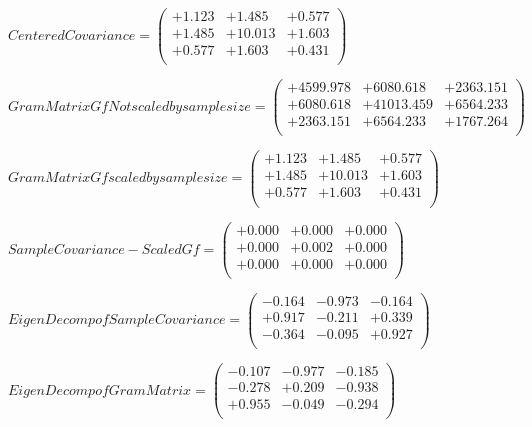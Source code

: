 \documentclass[9pt]{article}
\theoremstyle{plain}
\theoremstyle{definition}
\theoremstyle{remark}
\numberwithin{equation}{section}
\begin{document}
$Centered Covariance = \left(
\begin{array}{
ccc}
+1.123 & +1.485 & +0.577 \\
+1.485 & +10.013 & +1.603 \\
+0.577 & +1.603 & +0.431 \\
\end{array}
\right)$ \newline 

$Gram Matrix Gf Not scaled by sample size = \left(
\begin{array}{
ccc}
+4599.978 & +6080.618 & +2363.151 \\
+6080.618 & +41013.459 & +6564.233 \\
+2363.151 & +6564.233 & +1767.264 \\
\end{array}
\right)$ \newline 

$Gram Matrix Gf  scaled by sample size = \left(
\begin{array}{
ccc}
+1.123 & +1.485 & +0.577 \\
+1.485 & +10.013 & +1.603 \\
+0.577 & +1.603 & +0.431 \\
\end{array}
\right)$ \newline 

$SampleCovariance - Scaled Gf = \left(
\begin{array}{
ccc}
+0.000 & +0.000 & +0.000 \\
+0.000 & +0.002 & +0.000 \\
+0.000 & +0.000 & +0.000 \\
\end{array}
\right)$ \newline 

$EigenDecomp of SampleCovariance = \left(
\begin{array}{
ccc}
-0.164 & -0.973 & -0.164 \\
+0.917 & -0.211 & +0.339 \\
-0.364 & -0.095 & +0.927 \\
\end{array}
\right)$ \newline 

$EigenDecomp of Gram Matrix = \left(
\begin{array}{
ccc}
-0.107 & -0.977 & -0.185 \\
-0.278 & +0.209 & -0.938 \\
+0.955 & -0.049 & -0.294 \\
\end{array}
\right)$ \newline 
\end{document}
